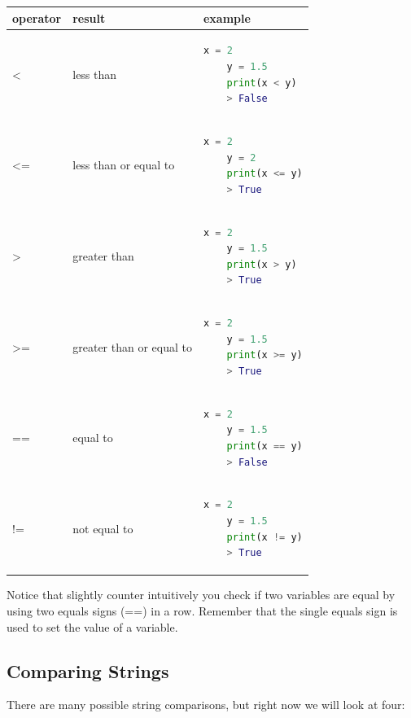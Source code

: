 \documentclass[]{article}
\begin{document}
\begin{center}
\begin{tabular}{ | m{5em}| m{7em} | m{20em} | } 
\hline
\textbf{operator} & \textbf{result} & \textbf{example} \\ 
\hline
< & less than & \begin{lstlisting}[language=python]
    x = 2
    y = 1.5
    print(x < y)
    > False
\end{lstlisting} \\ 
\hline
<= & less than or equal to & \begin{lstlisting}[language=python]
    x = 2
    y = 2
    print(x <= y)
    > True
\end{lstlisting} \\ 
\hline
> & greater than & \begin{lstlisting}[language=python]
    x = 2
    y = 1.5
    print(x > y)
    > True
\end{lstlisting} \\ 
\hline

 >= & greater than or equal to & \begin{lstlisting}[language=python]
    x = 2
    y = 1.5
    print(x >= y)
    > True
\end{lstlisting} \\ 
\hline

 == & equal to & \begin{lstlisting}[language=python]
    x = 2
    y = 1.5
    print(x == y)
    > False
\end{lstlisting} \\ 
\hline

 != & not equal to & \begin{lstlisting}[language=python]
    x = 2
    y = 1.5
    print(x != y)
    > True
\end{lstlisting} \\ 
\hline

\end{tabular}
\end{center}

Notice that slightly counter intuitively you check if two variables are equal by using two equals signs (==) in a row.  Remember that the single equals sign is used to set the value of a variable.  

\subsection{Comparing Strings}

There are many possible string comparisons, but right now we will look at four:
\end{document}
